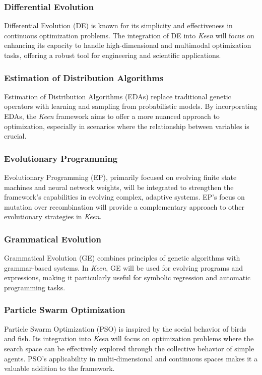         \subsubsection{Differential Evolution}
            Differential Evolution (DE) is known for its simplicity and effectiveness in continuous optimization 
            problems. The integration of DE into \textit{Keen} will focus on enhancing its capacity to handle 
            high-dimensional and multimodal optimization tasks, offering a robust tool for engineering and scientific 
            applications.

        \subsubsection{Estimation of Distribution Algorithms}
            Estimation of Distribution Algorithms (EDAs) replace traditional genetic operators with learning and 
            sampling from probabilistic models. By incorporating EDAs, the \textit{Keen} framework aims to offer a more 
            nuanced approach to optimization, especially in scenarios where the relationship between variables is 
            crucial.

        \subsubsection{Evolutionary Programming}
            Evolutionary Programming (EP), primarily focused on evolving finite state machines and neural network 
            weights, will be integrated to strengthen the framework's capabilities in evolving complex, adaptive 
            systems. EP's focus on mutation over recombination will provide a complementary approach to other 
            evolutionary strategies in \textit{Keen}.

        \subsubsection{Grammatical Evolution}
            Grammatical Evolution (GE) combines principles of genetic algorithms with grammar-based systems. In 
            \textit{Keen}, GE will be used for evolving programs and expressions, making it particularly useful for 
            symbolic regression and automatic programming tasks.

        \subsubsection{Particle Swarm Optimization}
            Particle Swarm Optimization (PSO) is inspired by the social behavior of birds and fish. Its integration into 
            \textit{Keen} will focus on optimization problems where the search space can be effectively explored through 
            the collective behavior of simple agents. PSO's applicability in multi-dimensional and continuous spaces 
            makes it a valuable addition to the framework.

